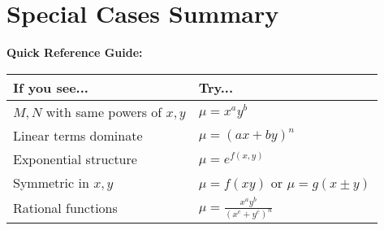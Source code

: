 \documentclass[12pt]{article}
\begin{document}
\section{Special Cases Summary}

\begin{keypoint}
\textbf{Quick Reference Guide:}
\begin{center}
\begin{tabular}{|l|l|}
\hline
\textbf{If you see...} & \textbf{Try...} \\
\hline
$M, N$ with same powers of $x,y$ & $\mu = x^a y^b$ \\
Linear terms dominate & $\mu = (ax + by)^n$ \\
Exponential structure & $\mu = e^{f(x,y)}$ \\
Symmetric in $x,y$ & $\mu = f(xy)$ or $\mu = g(x \pm y)$ \\
Rational functions & $\mu = \frac{x^a y^b}{(x^c + y^c)^n}$ \\
\hline
\end{tabular}
\end{center}
\end{keypoint}
\end{document}
